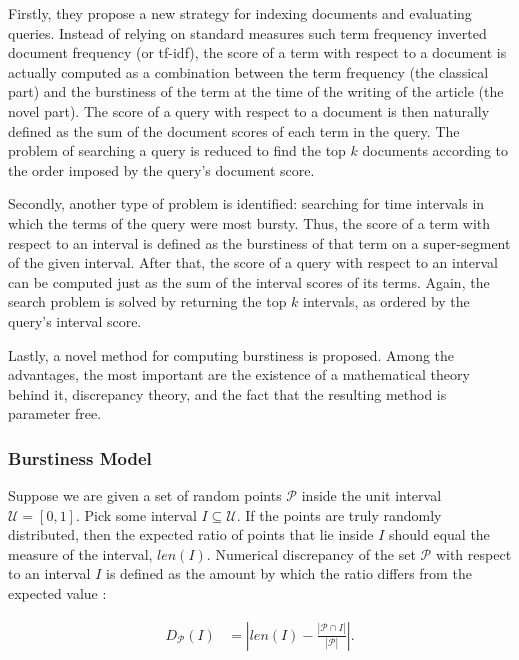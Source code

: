 Firstly, they propose a new strategy for indexing documents and evaluating queries. Instead of relying on standard measures such term frequency inverted document frequency (or tf-idf), the score of a term with respect to a document is actually computed as a combination between the term frequency (the classical part) and the burstiness of the term at the time of the writing of the article (the novel part). The score of a query with respect to a document is then naturally defined as the sum of the document scores of each term in the query. The problem of searching a query is reduced to find the top $k$ documents according to the order imposed by the query's document score.

Secondly, another type of problem is identified: searching for time intervals in which the terms of the query were most bursty. Thus, the score of a term with respect to an interval is defined as the burstiness of that term on a super-segment of the given interval. After that, the score of a query with respect to an interval can be computed just as the sum of the interval scores of its terms. Again, the search problem is solved by returning the top $k$ intervals, as ordered by the query's interval score.

Lastly, a novel method for computing burstiness is proposed. Among the advantages, the most important are the existence of a mathematical theory behind it, discrepancy theory, and the fact that the resulting method is parameter free.

\subsubsection{Burstiness Model}

Suppose we are given a set of random points $\mathcal{P}$ inside the unit interval $\mathcal{U} = \left[ 0, 1 \right]$. Pick some interval $I \subseteq \mathcal{U}$. If the points are truly randomly distributed, then the expected ratio of points that lie inside $I$ should equal the measure of the interval, $len \left( I \right)$. Numerical discrepancy of the set $\mathcal{P}$ with respect to an interval $I$ is defined as the amount by which the ratio differs from the expected value \cite{Dobkin:1996:CMB:233502.233508}:

\begin{align}
\label{eq:numerical-discrepancy}
D_{\mathcal{P}} \left( I \right) &= \left| len \left( I \right) - \frac{\left| \mathcal{P} \cap I \right|}{\left| \mathcal{P} \right|} \right|.
\end{align}

